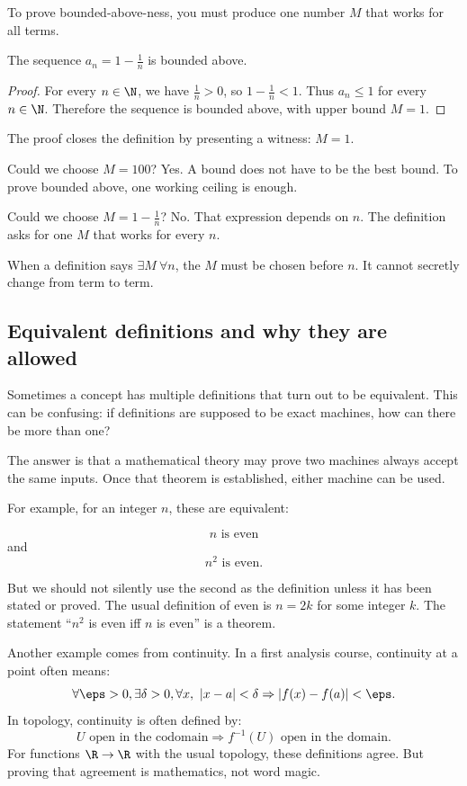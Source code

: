 To prove bounded-above-ness, you must produce one number $M$ that works for all terms.

\begin{theorem}
The sequence $a_n=1-\frac1n$ is bounded above.
\end{theorem}

\begin{proof}
For every $n\in\N$, we have $\frac1n>0$, so $1-\frac1n<1$. Thus $a_n\leq1$ for every $n\in\N$. Therefore the sequence is bounded above, with upper bound $M=1$.
\end{proof}

The proof closes the definition by presenting a witness: $M=1$.

Could we choose $M=100$? Yes. A bound does not have to be the best bound. To prove bounded above, one working ceiling is enough.

Could we choose $M=1-\frac1n$? No. That expression depends on $n$. The definition asks for one $M$ that works for every $n$.

\begin{trapbox}
When a definition says $\exists M\ \forall n$, the $M$ must be chosen before $n$. It cannot secretly change from term to term.
\end{trapbox}

\subsection{Equivalent definitions and why they are allowed}

Sometimes a concept has multiple definitions that turn out to be equivalent. This can be confusing: if definitions are supposed to be exact machines, how can there be more than one?

The answer is that a mathematical theory may prove two machines always accept the same inputs. Once that theorem is established, either machine can be used.

For example, for an integer $n$, these are equivalent:

\[
n\text{ is even}
\]
and
\[
n^2\text{ is even}.
\]

But we should not silently use the second as the definition unless it has been stated or proved. The usual definition of even is $n=2k$ for some integer $k$. The statement ``$n^2$ is even iff $n$ is even'' is a theorem.

Another example comes from continuity. In a first analysis course, continuity at a point often means:
\[
\forall\eps>0,\exists\delta>0,\forall x,\ |x-a|<\delta\Rightarrow |f(x)-f(a)|<\eps.
\]
In topology, continuity is often defined by:
\[
U\text{ open in the codomain}\Rightarrow f^{-1}(U)\text{ open in the domain}.
\]
For functions $\R\to\R$ with the usual topology, these definitions agree. But proving that agreement is mathematics, not word magic.

